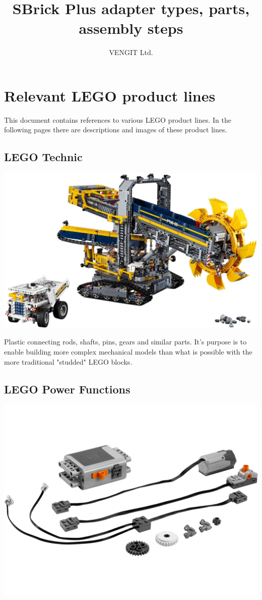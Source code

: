 \documentclass[a4paper,12pt]{article}
\title{SBrick Plus adapter types, parts, assembly steps}
\author{VENGIT Ltd.}
\begin{document}
\maketitle

\pagebreak

\section{Relevant LEGO product lines}

This document contains references to various LEGO product lines. In the
following pages there are descriptions and images of these product lines.

\subsection{LEGO Technic}

\includegraphics[width=13.5cm]{lego-technic.jpg}

Plastic connecting rods, shafts, pins, gears and similar parts. It's purpose
is to enable building more complex mechanical models than what is possible
with the more traditional "studded" LEGO blocks.

\subsection{LEGO Power Functions}

\includegraphics[width=13.5cm]{lego-power-functions.jpg}
\end{document}
